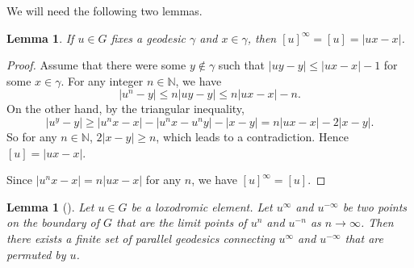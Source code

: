 \documentclass[a4paper]{article}
\newtheorem{lem}[thm]{Lemma}
\theoremstyle{remark}
\begin{document}
\quad

We will need the following two lemmas.

\begin{lem}\label{stable length = translation length}
    If $u\in G$ fixes a geodesic $\gamma$ and $x\in \gamma$, then $[u]^\infty = [u] = |ux-x|$.
\end{lem}
\begin{proof}
    Assume that there were some $y\not\in \gamma$ such that $|uy-y|\leq |ux-x|-1$ for some $x\in \gamma$. For any integer $n\in \mathbb{N}$, we have \[|u^n-y|\leq n|uy-y|\leq n|ux-x|-n.\]
    On the other hand, by the triangular inequality, \[|u^y-y|\geq |u^nx-x|-|u^nx-u^ny|-|x-y| = n|ux-x|-2|x-y|.\]
    So for any $n\in \mathbb{N}$, $2|x-y|\geq n$, which leads to a contradiction. Hence $[u] = |ux-x|$. 

    Since $|u^nx-x| = n|ux-x|$ for any $n$, we have $[u]^\infty = [u]$.
\end{proof}

\begin{lem}[{\cite[Proposition 3.1]{Del96}}]\label{existence of parallel geodesics} Let $u\in G$ be a loxodromic element. Let $u^\infty$ and $u^{-\infty}$ be two points on the boundary of $G$ that are the limit points of $u^n$ and $u^{-n}$ as $n\to\infty$. Then there exists a finite set of parallel geodesics connecting $u^\infty$ and $u^{-\infty}$ that are permuted by $u$.
\end{lem}

\quad
\end{document}
